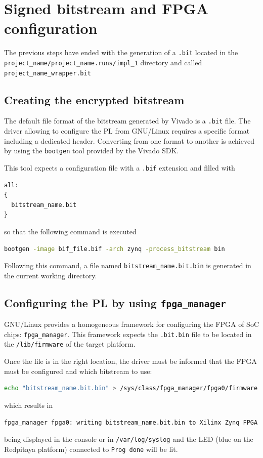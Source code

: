 \documentclass[10pt,oneside]{article}
\begin{document}
\section{Signed bitstream and FPGA configuration}

The previous steps have ended with the generation of a {\tt .bit} located in
the \\{\tt project\_name/project\_name.runs/impl\_1} directory and called 
{\tt project\_name\_wrapper.bit}

\subsection{Creating the encrypted bitstream}

The default file format of the bitstream generated by Vivado is a {\tt .bit} file.
The driver allowing to configure the PL from GNU/Linux requires a specific format
including a dedicated header. Converting from one format to another is achieved by
using the {\tt bootgen} tool provided by the Vivado SDK.

This tool expects a configuration file with a {\tt .bif} extension and filled with
\begin{lstlisting}
all:
{
  bitstream_name.bit
}
\end{lstlisting}

so that the following command is executed
\begin{lstlisting}[language=bash]
bootgen -image bif_file.bif -arch zynq -process_bitstream bin
\end{lstlisting}

Following this command, a file named {\tt bitstream\_name.bit.bin} is generated in
the current working directory.

\subsection{Configuring the PL by using {\tt fpga\_manager}}

GNU/Linux provides a homogeneous framework for configuring the FPGA of SoC chips: {\tt fpga\_manager}.
This framework expects the {\tt .bit.bin} file to be located in the {\tt /lib/firmware} of the
target platform.

Once the file is in the right location, the driver must be informed that the
FPGA must be configured and which bitstream to use:
\begin{lstlisting}[language=bash]
echo "bitstream_name.bit.bin" > /sys/class/fpga_manager/fpga0/firmware
\end{lstlisting}
which results in
\begin{lstlisting}[language=bash]
fpga_manager fpga0: writing bitstream_name.bit.bin to Xilinx Zynq FPGA Manager
\end{lstlisting}
being displayed in the console or in {\tt /var/log/syslog} and the LED (blue on the
Redpitaya platform) connected to {\tt Prog done} will be lit.
\end{document}
